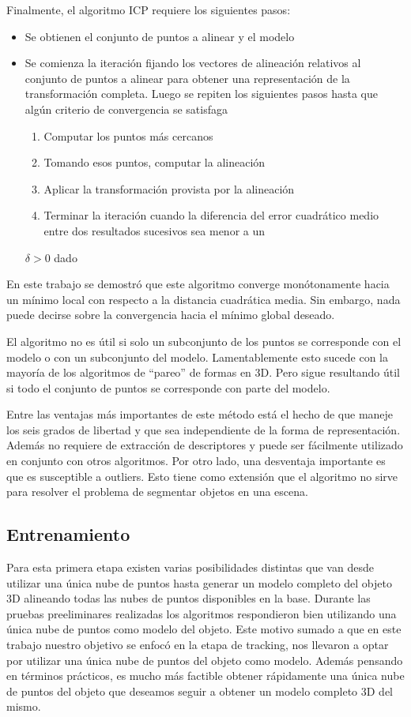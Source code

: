 Finalmente, el algoritmo ICP requiere los siguientes pasos:
\begin{itemize}
	\item Se obtienen el conjunto de puntos a alinear y el modelo
	\item Se comienza la iteración fijando los vectores de alineación relativos al conjunto de puntos a alinear para obtener una representación de la transformación completa. Luego se repiten los siguientes pasos hasta que algún criterio de convergencia se satisfaga
	\begin{enumerate}
		\item Computar los puntos más cercanos
		\item Tomando esos puntos, computar la alineación
		\item Aplicar la transformación provista por la alineación
		\item Terminar la iteración cuando la diferencia del error cuadrático medio entre dos resultados sucesivos sea menor a un
	\end{enumerate}
 $\delta > 0$ dado
\end{itemize}

En este trabajo se demostró que este algoritmo converge monótonamente hacia un mínimo local con respecto a la distancia cuadrática media. Sin embargo, nada puede decirse sobre la convergencia hacia el mínimo global deseado.

El algoritmo no es útil si solo un subconjunto de los puntos se corresponde con el modelo o con un subconjunto del modelo. Lamentablemente esto sucede con la mayoría de los algoritmos de ``pareo'' de formas en 3D. Pero sigue resultando útil si todo el conjunto de puntos se corresponde con parte del modelo.

Entre las ventajas más importantes de este método está el hecho de que maneje los seis grados de libertad y que sea independiente de la forma de representación. Además no requiere de extracción de descriptores y puede ser fácilmente utilizado en conjunto con otros algoritmos. Por otro lado, una desventaja importante es que es susceptible a outliers. Esto tiene como extensión que el algoritmo no sirve para resolver el problema de segmentar objetos en una escena.



\subsection{Entrenamiento}
Para esta primera etapa existen varias posibilidades distintas que van desde utilizar una única nube de puntos hasta generar un modelo completo del objeto 3D alineando todas las nubes de puntos disponibles en la base. Durante las pruebas preeliminares realizadas los algoritmos respondieron bien utilizando una única nube de puntos como modelo del objeto. Este motivo sumado a que en este trabajo nuestro objetivo se enfocó en la etapa de tracking, nos llevaron a optar por utilizar una única nube de puntos del objeto como modelo. Además pensando en términos prácticos, es mucho más factible obtener rápidamente una única nube de puntos del objeto que deseamos seguir a obtener un modelo completo 3D del mismo.


